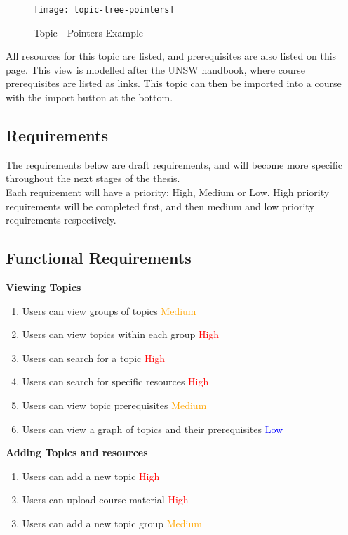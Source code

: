 \begin{figure}[h!]
    \centering
    \texttt{[image: topic-tree-pointers]}
    \caption{Topic - Pointers Example}
\end{figure}

All resources for this topic are listed, and prerequisites are also listed on this page. This view is modelled after the UNSW handbook, where course prerequisites are listed as links. This topic can then be imported into a course with the import button at the bottom.\\

\subsection{Requirements}
The requirements below are draft requirements, and will become more specific throughout the next stages of the thesis.\\
Each requirement will have a priority: High, Medium or Low. High priority requirements will be completed first, and then medium and low priority requirements respectively. \\

\subsection{Functional Requirements}

\textbf{Viewing Topics}

    \begin{enumerate}
    \item Users can view groups of topics \textcolor{Orange}{Medium}
    \item Users can view topics within each group \textcolor{Red}{High}
    \item Users can search for a topic \textcolor{Red}{High}
    \item Users can search for specific resources \textcolor{Red}{High}
    \item Users can view topic prerequisites \textcolor{Orange}{Medium}
    \item Users can view a graph of topics and their prerequisites \textcolor{Blue}{Low}
    \end{enumerate}

\textbf{Adding Topics and resources}
    \begin{enumerate}
    \item Users can add a new topic \textcolor{Red}{High}
    \item Users can upload course material \textcolor{Red}{High}
    \item Users can add a new topic group \textcolor{Orange}{Medium}
    \end{enumerate}

